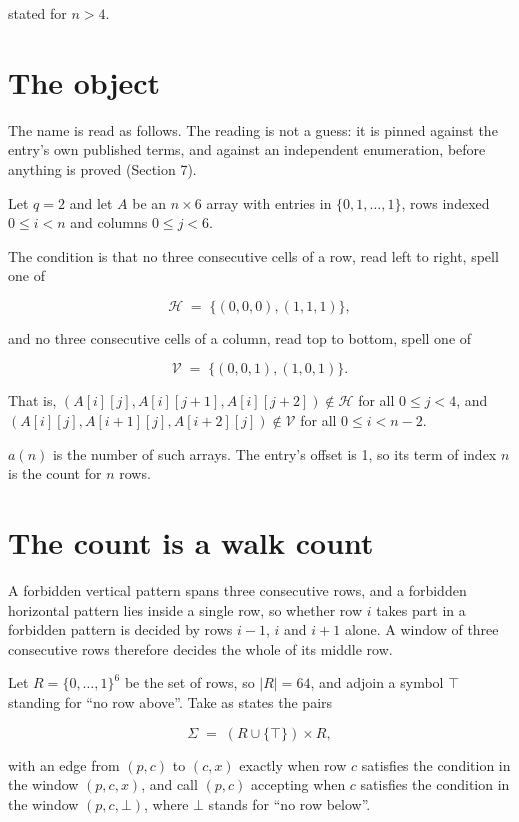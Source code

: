 \documentclass[11pt]{article}
\theoremstyle{definition}
\begin{document}
stated for $n > 4$.

\section{The object}

The name is read as follows. The reading is not a guess: it is pinned against the entry's own published terms, and against an independent enumeration, before anything is proved (Section 7).

Let $q = 2$ and let $A$ be an $n \times 6$ array with entries in $\{0,1,\dots,1\}$, rows indexed $0 \le i < n$ and columns $0 \le j < 6$.

The condition is that no three consecutive cells of a row, read left to right, spell one of

\[\mathcal{H} \;=\; \{(0,0,0), (1,1,1)\},\]

and no three consecutive cells of a column, read top to bottom, spell one of

\[\mathcal{V} \;=\; \{(0,0,1), (1,0,1)\}.\]

That is, $(A[i][j],A[i][j{+}1],A[i][j{+}2]) \notin \mathcal{H}$ for all $0 \le j < 4$, and $(A[i][j],A[i{+}1][j],A[i{+}2][j]) \notin \mathcal{V}$ for all $0 \le i < n-2$.

$a(n)$ is the number of such arrays. The entry's offset is 1, so its term of index $n$ is the count for $n$ rows.

\section{The count is a walk count}

A forbidden vertical pattern spans three consecutive rows, and a forbidden horizontal pattern lies inside a single row, so whether row $i$ takes part in a forbidden pattern is decided by rows $i-1$, $i$ and $i+1$ alone. A window of three consecutive rows therefore decides the whole of its middle row.

Let $R = \{0,\dots,1\}^{6}$ be the set of rows, so $|R| = 64$, and adjoin a symbol $\top$ standing for ``no row above''. Take as states the pairs

\[\Sigma \;=\; (R \cup \{\top\}) \times R,\]

with an edge from $(p,c)$ to $(c,x)$ exactly when row $c$ satisfies the condition in the window $(p,c,x)$, and call $(p,c)$ accepting when $c$ satisfies the condition in the window $(p,c,\bot)$, where $\bot$ stands for ``no row below''.
\end{document}
